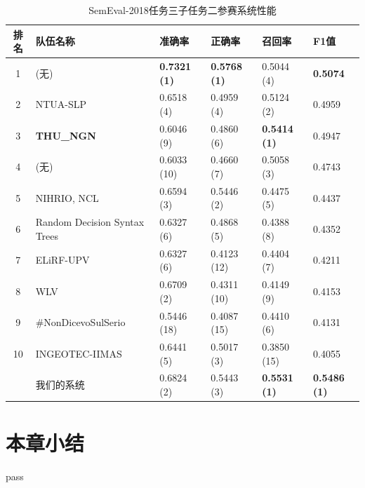 \begin{table}[htb]
  \centering
  \begin{minipage}[t]{\linewidth}
  \caption{SemEval-2018任务三子任务二参赛系统性能} %
  \label{tab:exp_irony_det_B_other_comp}
    \begin{tabularx}{\linewidth}{c|X|llll}
    \toprule[1.5pt]
    排名 & 队伍名称 & 准确率 & 正确率 & 召回率 & F1值 \\
    \hline 
    1 & (无) & \bf 0.7321 (1) & \bf 0.5768 (1) & 0.5044 (4) & \bf 0.5074 \\
    2 & NTUA-SLP & 0.6518 (4) & 0.4959 (4) & 0.5124 (2) & 0.4959 \\
    3 & \bf THU\_NGN & 0.6046 (9) & 0.4860 (6) & \bf 0.5414 (1) & 0.4947 \\
    4 & (无) & 0.6033 (10) & 0.4660 (7) & 0.5058 (3) & 0.4743 \\
    5 & NIHRIO, NCL & 0.6594 (3) & 0.5446 (2) & 0.4475 (5) & 0.4437 \\
    6 & Random Decision Syntax Trees & 0.6327 (6) & 0.4868 (5) & 0.4388 (8) & 0.4352 \\
    7 & ELiRF-UPV & 0.6327 (6) & 0.4123 (12) & 0.4404 (7) & 0.4211 \\
    8 & WLV & 0.6709 (2) & 0.4311 (10) & 0.4149 (9) & 0.4153 \\
    9 & \#NonDicevoSulSerio & 0.5446 (18) & 0.4087 (15) & 0.4410 (6) & 0.4131 \\
    10 & INGEOTEC-IIMAS & 0.6441 (5) & 0.5017 (3) & 0.3850 (15) & 0.4055 \\
    \hline
    & 我们的系统 & 0.6824 (2) & 0.5443 (3) & \bf 0.5531 (1) & \bf 0.5486 (1) \\
    \bottomrule[1.5pt]
    \end{tabularx}
  \end{minipage}
\end{table}



\section{本章小结}

pass

